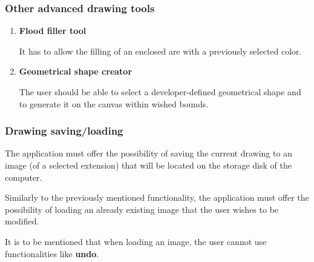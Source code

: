 \documentclass{article}
\begin{document}
\subsubsection{Other advanced drawing tools}
\begin{enumerate}

\item \textbf{Flood filler tool}

It has to allow the filling of an enclosed are with a previously selected color.

\item  \textbf{Geometrical shape creator}

The user should be able to select a developer-defined geometrical shape and to generate it on the canvas within wished bounds.

\end{enumerate}

\subsubsection{Drawing saving/loading}

The application must offer the possibility of saving the current drawing to an image (of a selected extension) that will be located on the storage disk of the computer.

Similarly to the previously mentioned functionality, the application must offer the possibility of loading an already existing image that the user wishes to be modified.

It is to be mentioned that when loading an image, the user cannot use functionalities like \textbf{undo}.
\end{document}
